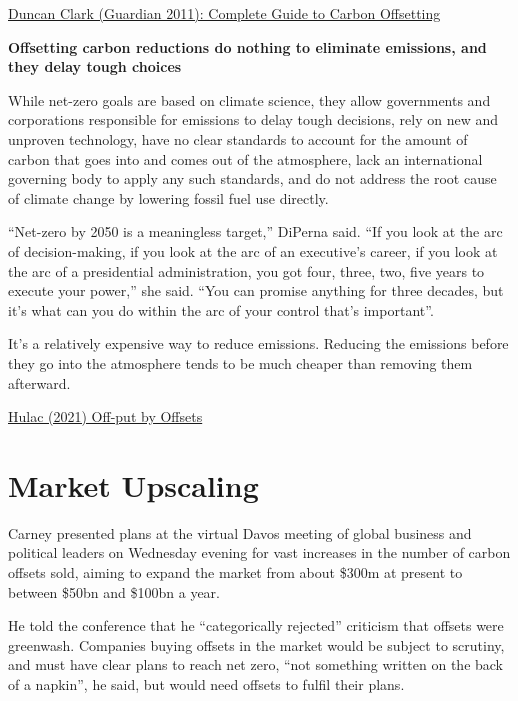 \documentclass[
]{book}
\begin{document}
\href{https://www.theguardian.com/environment/2011/sep/16/carbon-offset-projects-carbon-emissions\#:~:text=Carbon\%20offset\%20schemes\%20allow\%20individuals,designed\%20to\%20reduce\%20future\%20emissions.}{Duncan Clark (Guardian 2011): Complete Guide to Carbon Offsetting}

\textbf{Offsetting carbon reductions do nothing to eliminate emissions, and they delay tough choices}

While net-zero goals are based on climate science, they allow governments and corporations responsible for emissions to delay tough decisions, rely on new and unproven technology, have no clear standards to account for the amount of carbon that goes into and comes out of the atmosphere, lack an international governing body to apply any such standards, and do not address the root cause of climate change by lowering fossil fuel use directly.

``Net-zero by 2050 is a meaningless target,'' DiPerna said. ``If you look at the arc of decision-making, if you look at the arc of an executive's career, if you look at the arc of a presidential administration, you got four, three, two, five years to execute your power,'' she said. ``You can promise anything for three decades, but it's what can you do within the arc of your control that's important''.

It's a relatively expensive way to reduce emissions. Reducing the emissions before they go into the atmosphere tends to be much cheaper than removing them afterward.

\href{https://www.rollcall.com/2021/05/05/off-put-by-offsets-why-some-advocates-doubt-net-zero-pledges/}{Hulac (2021) Off-put by Offsets}

\hypertarget{market-upscaling}{%
\section{Market Upscaling}\label{market-upscaling}}

Carney presented plans at the virtual Davos meeting of global business and political leaders on Wednesday evening for vast increases in the number of carbon offsets sold, aiming to expand the market from about \$300m at present to between \$50bn and \$100bn a year.

He told the conference that he ``categorically rejected'' criticism that offsets were greenwash. Companies buying offsets in the market would be subject to scrutiny, and must have clear plans to reach net zero, ``not something written on the back of a napkin'', he said, but would need offsets to fulfil their plans.
\end{document}
